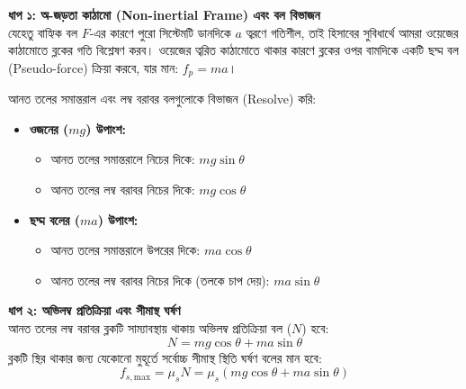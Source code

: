 \documentclass[12pt, a4paper]{article}
\begin{document}
\begin{tcolorbox}[solutionbox={সমাধান (Solution)}]
\noindent
\textbf{ধাপ ১: অ-জড়তা কাঠামো (Non-inertial Frame) এবং বল বিভাজন} \\
যেহেতু বাহ্যিক বল $F$-এর কারণে পুরো সিস্টেমটি ডানদিকে $a$ ত্বরণে গতিশীল, তাই হিসাবের সুবিধার্থে আমরা ওয়েজের কাঠামোতে ব্লকের গতি বিশ্লেষণ করব। ওয়েজের ত্বরিত কাঠামোতে থাকার কারণে ব্লকের ওপর বামদিকে একটি ছদ্ম বল (Pseudo-force) ক্রিয়া করবে, যার মান: $f_p = ma$।

আনত তলের সমান্তরাল এবং লম্ব বরাবর বলগুলোকে বিভাজন (Resolve) করি:
\begin{itemize}[leftmargin=*, parsep=0.5ex]
    \item \textbf{ওজনের ($mg$) উপাংশ:} 
    \begin{itemize}
        \item আনত তলের সমান্তরালে নিচের দিকে: $mg \sin\theta$
        \item আনত তলের লম্ব বরাবর নিচের দিকে: $mg \cos\theta$
    \end{itemize}
    \item \textbf{ছদ্ম বলের ($ma$) উপাংশ:} 
    \begin{itemize}
        \item আনত তলের সমান্তরালে উপরের দিকে: $ma \cos\theta$
        \item আনত তলের লম্ব বরাবর নিচের দিকে (তলকে চাপ দেয়): $ma \sin\theta$
    \end{itemize}
\end{itemize}

\vspace{0.5em}
\noindent
\textbf{ধাপ ২: অভিলম্ব প্রতিক্রিয়া এবং সীমাস্থ ঘর্ষণ} \\
আনত তলের লম্ব বরাবর ব্লকটি সাম্যাবস্থায় থাকায় অভিলম্ব প্রতিক্রিয়া বল ($N$) হবে:
\[ N = mg \cos\theta + ma \sin\theta \]
ব্লকটি স্থির থাকার জন্য যেকোনো মুহূর্তে সর্বোচ্চ সীমাস্থ স্থিতি ঘর্ষণ বলের মান হবে:
\[ f_{s,\text{max}} = \mu_s N = \mu_s (mg \cos\theta + ma \sin\theta) \]


\end{tcolorbox}
\end{document}
